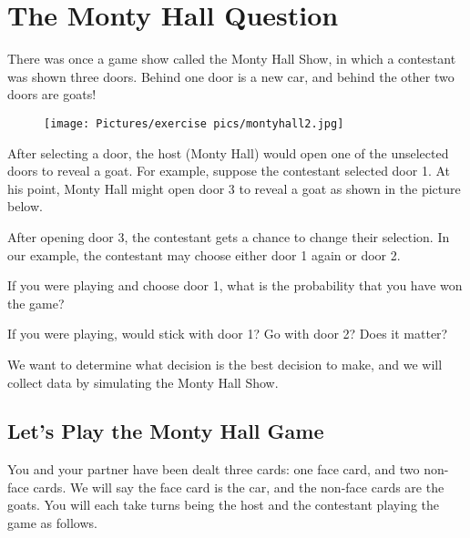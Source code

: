 
\section{The Monty Hall Question}

There was once a game show called the Monty Hall Show, in which a contestant was shown three doors. Behind one door is a new car, and behind the other two doors are goats!

\begin{figure}[h]
    \centering
    \texttt{[image: Pictures/exercise pics/montyhall2.jpg]}
    \label{montyhall}
\end{figure}

\noindent After selecting a door, the host (Monty Hall) would open one of the unselected doors to reveal a goat. For example, suppose the contestant selected door 1. At his point, Monty Hall might open door 3 to reveal a goat as shown in the picture below.

\noindent After opening door 3, the contestant gets a chance to change their selection. In our example, the contestant may choose either door 1 again or door 2. 

\begin{exercise}
If you were playing and choose door 1, what is the probability that you have won the game?
\end{exercise}

\begin{exercise}
If you were playing, would stick with door 1? Go with door 2? Does it matter?
\end{exercise}

\blanks

\noindent We want to determine what decision is the best decision to make, and we will collect data by simulating the Monty Hall Show. 

\subsection{Let's Play the Monty Hall Game}

You and your partner have been dealt three cards: one face card, and two non-face cards. We will say the face card is the car, and the non-face cards are the goats. You will each take turns being the host and the contestant playing the game as follows.


